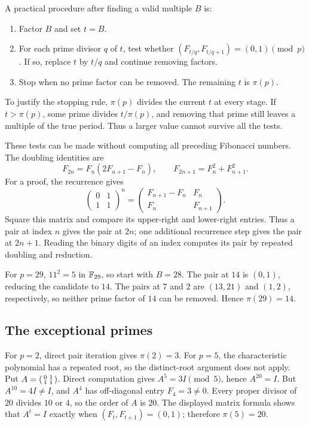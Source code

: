 A practical procedure after finding a valid multiple $B$ is:
\begin{enumerate}
  \item Factor $B$ and set $t=B$.
  \item For each prime divisor $q$ of $t$, test whether
  $(F_{t/q},F_{t/q+1})=(0,1)\pmod p$.
  If so, replace $t$ by $t/q$ and continue removing factors.
  \item Stop when no prime factor can be removed. The remaining $t$
  is $\pi(p)$.
\end{enumerate}
To justify the stopping rule, $\pi(p)$ divides the current $t$ at every
stage. If $t>\pi(p)$, some prime divides $t/\pi(p)$, and removing that
prime still leaves a multiple of the true period. Thus a larger value
cannot survive all the tests.

These tests can be made without computing all preceding Fibonacci
numbers. The doubling identities are
\[
 F_{2n}=F_n(2F_{n+1}-F_n),\qquad
 F_{2n+1}=F_n^2+F_{n+1}^2.
\]
For a proof, the recurrence gives
\[
 \begin{pmatrix}0&1\\1&1\end{pmatrix}^{n}
 =\begin{pmatrix}F_{n+1}-F_n&F_n\\F_n&F_{n+1}\end{pmatrix}.
\]
Square this matrix and compare its upper-right and lower-right entries.
Thus a pair at index $n$ gives the pair at $2n$; one additional recurrence
step gives the pair at $2n+1$. Reading the binary digits of an index
computes its pair by repeated doubling and reduction.

For $p=29$, $11^2=5$ in $\mathbb F_{29}$, so start with $B=28$.
The pair at $14$ is $(0,1)$, reducing the candidate to $14$.
The pairs at $7$ and $2$ are $(13,21)$ and $(1,2)$, respectively,
so neither prime factor of $14$ can be removed. Hence $\pi(29)=14$.

\subsection*{The exceptional primes}

For $p=2$, direct pair iteration gives $\pi(2)=3$.
For $p=5$, the characteristic polynomial has a repeated root, so the
distinct-root argument does not apply. Put
$A=\begin{psmallmatrix}0&1\\1&1\end{psmallmatrix}$. Direct computation
gives $A^5=3I\pmod5$, hence $A^{20}=I$.
But $A^{10}=4I\ne I$, and $A^4$ has off-diagonal entry $F_4=3\ne0$.
Every proper divisor of $20$ divides $10$ or $4$, so the order of $A$
is $20$. The displayed matrix formula shows that $A^t=I$ exactly when
$(F_t,F_{t+1})=(0,1)$; therefore $\pi(5)=20$.

